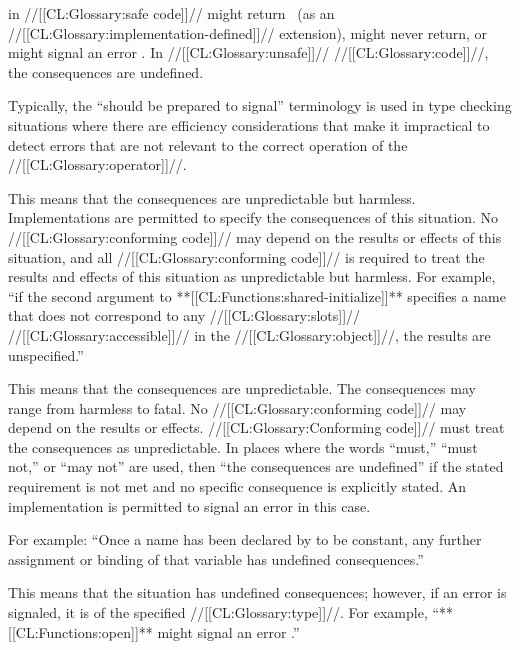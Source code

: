 in //[[CL:Glossary:safe code]]//
   might return \nil\ (as an //[[CL:Glossary:implementation-defined]]// extension),
   might never return,
or might signal an error .
In //[[CL:Glossary:unsafe]]// //[[CL:Glossary:code]]//, the consequences are undefined.

Typically, the ``should be prepared to signal'' terminology is used in
type checking situations where there are efficiency considerations that
make it impractical to detect errors that are not relevant to the
correct operation of the //[[CL:Glossary:operator]]//.

%

This means that the consequences are unpredictable but harmless.
Implementations are permitted to specify the consequences of this
situation. No //[[CL:Glossary:conforming code]]// may depend on the results or effects of
this situation, and all //[[CL:Glossary:conforming code]]// is required to treat the
results and effects of this situation as unpredictable but harmless.
For example, ``if the second argument to **[[CL:Functions:shared-initialize]]**
specifies a name that does not correspond to any //[[CL:Glossary:slots]]//
//[[CL:Glossary:accessible]]// in the //[[CL:Glossary:object]]//, the results are unspecified.''


%

This means that the consequences are unpredictable. The consequences
may range from harmless to fatal.  No //[[CL:Glossary:conforming code]]// may depend on
the results or effects. //[[CL:Glossary:Conforming code]]// must treat the consequences as
unpredictable.  In places where the words ``must,'' ``must not,'' or
``may not'' are used, then ``the consequences are undefined'' if the
stated requirement is not met and no specific consequence is
explicitly stated.  An implementation is permitted to signal an error
in this case.

For example: ``Once a name has been declared by 
to be constant, any further assignment or binding of that
variable has undefined consequences.''
                                               
%

This means that the situation has undefined consequences;
however, if an error is signaled, it is of the specified //[[CL:Glossary:type]]//.
For example, ``**[[CL:Functions:open]]** might signal an error .''
                           
